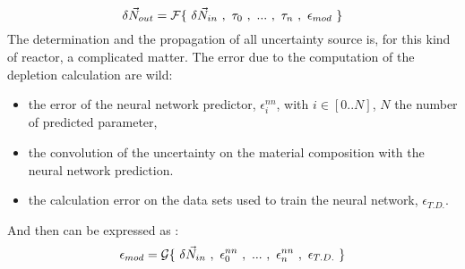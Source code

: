 \documentclass[dvips,12pt]{article}
\begin{document}
\begin{equation}
\delta \vec{N}_{out} = {\cal F}\{~\delta\vec{N}_{in}~,~\tau_0~,~...~,~\tau_n~,~\epsilon_{mod}~\}
\end{equation}
The determination and the propagation of all
uncertainty source is, for this kind of reactor, a
complicated matter. The error due to the
computation of the depletion calculation are wild:
\begin{itemize}
\item the error of the neural network predictor,
  $\epsilon^{nn}_{i}$, with $i\in[0..N]$, $N$ the
  number of predicted parameter,
\item the convolution of the uncertainty on the
  material composition with the neural network
  prediction.
\item the calculation error on the data sets used
  to train the neural network, $\epsilon_{T.D.}$.
\end{itemize}
And then can be expressed as :
\begin{equation}
\epsilon_{mod} = {\cal G}\{~\delta\vec{N}_{in}~,~\epsilon^{nn}_{0}~,~...~,~\epsilon^{nn}_{n}~,~\epsilon_{T.D.}~\}
\end{equation}
\end{document}
